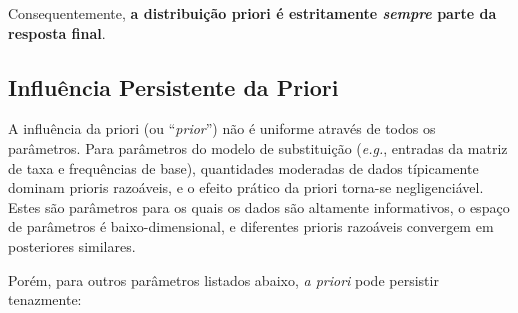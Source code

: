 Consequentemente, \textbf{a distribuição priori é estritamente \textit{sempre} parte da resposta final}.

\subsection{Influência Persistente da Priori}

A influência da priori (ou ``\textit{prior}'') não é uniforme através de todos os parâmetros. Para parâmetros do modelo de substituição (\textit{e.g.}, entradas da matriz de taxa e frequências de base), quantidades moderadas de dados típicamente dominam prioris razoáveis, e o efeito prático da priori torna-se negligenciável. Estes são parâmetros para os quais os dados são altamente informativos, o espaço de parâmetros é baixo-dimensional, e diferentes prioris razoáveis convergem em posteriores similares.

Porém, para outros parâmetros listados abaixo, \textit{a priori} pode persistir tenazmente:

